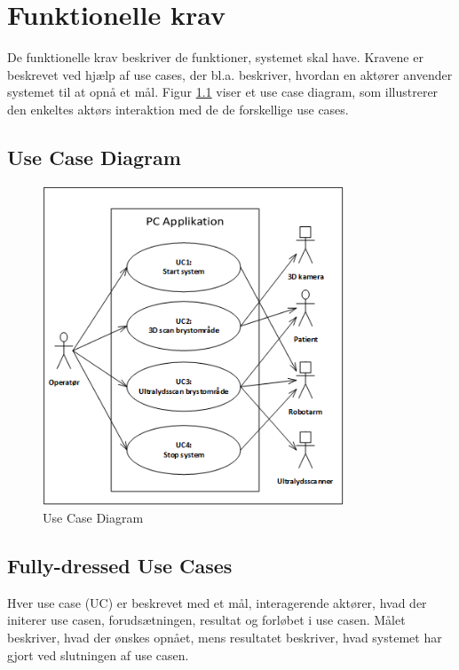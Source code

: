 \chapter{Funktionelle krav}\label{Funktionellekrav}
De funktionelle krav beskriver de funktioner, systemet skal have. Kravene er beskrevet ved hjælp af use cases, der bl.a. beskriver, hvordan en aktører anvender systemet til at opnå et mål. Figur \ref{UseCaseDiagram} viser et use case diagram, som illustrerer den enkeltes aktørs interaktion med de de forskellige use cases. 

\section{Use Case Diagram}
\begin{figure}[H]
    \centering
    \includegraphics[width=0.80\textwidth]{figurer/d/Kravspecifikation/UseCaseDiagram}
    \caption{Use Case Diagram}
    \label{UseCaseDiagram}
\end{figure}
\newpage

\section{Fully-dressed Use Cases}
Hver use case (UC) er beskrevet med et mål, interagerende aktører, hvad der initerer use casen, forudsætningen, resultat og forløbet i use casen. Målet beskriver, hvad der ønskes opnået, mens resultatet beskriver, hvad systemet har gjort ved slutningen af use casen. 

